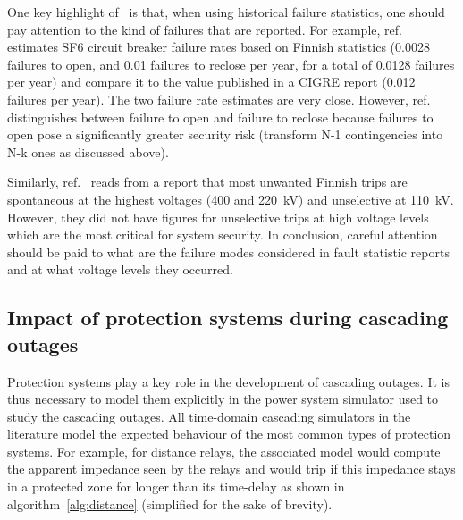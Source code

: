 \begin{tcolorbox}[width=\linewidth, %
    colback=red!5!white,
    colframe=red!75!black,
    breakable,
    float, floatplacement=h,
    title=Note]
One key highlight of~\cite{GridPSA} is that, when using historical failure statistics, one should pay attention to the kind of failures that are reported. For example, ref.~\cite{GridPSA} estimates SF6 circuit breaker failure rates based on Finnish statistics (0.0028 failures to open, and 0.01 failures to reclose per year, for a total of 0.0128 failures per year) and compare it to the value published in a CIGRE report (0.012 failures per year). The two failure rate estimates are very close. However, ref.~\cite{GridPSA} distinguishes between failure to open and failure to reclose because failures to open pose a significantly greater security risk (transform N-1 contingencies into N-k ones as discussed above).

Similarly, ref.~\cite{GridPSA} reads from a report that most unwanted Finnish trips are spontaneous at the highest voltages (400 and 220~kV) and unselective at 110~kV. However, they did not have figures for unselective trips at high voltage levels which are the most critical for system security. In conclusion, careful attention should be paid to what are the failure modes considered in fault statistic reports and at what voltage levels they occurred.
\end{tcolorbox}



\subsection{Impact of protection systems during cascading outages}
\label{sec:protection_cascade}

Protection systems play a key role in the development of cascading outages. It is thus necessary to model them explicitly in the power system simulator used to study the cascading outages. All time-domain cascading simulators in the literature model the expected behaviour of the most common types of protection systems. For example, for distance relays, the associated model would compute the apparent impedance seen by the relays and would trip if this impedance stays in a protected zone for longer than its time-delay as shown in algorithm~\ref{alg:distance} (simplified for the sake of brevity). %

